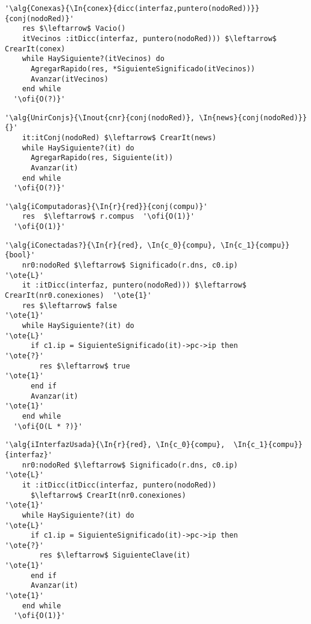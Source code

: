 \begin{lstlisting}[mathescape]
  '\alg{Conexas}{\In{conex}{dicc(interfaz,puntero(nodoRed))}}{conj(nodoRed)}'
    res $\leftarrow$ Vacio()
    itVecinos :itDicc(interfaz, puntero(nodoRed))) $\leftarrow$ CrearIt(conex)
    while HaySiguiente?(itVecinos) do                                                    
      AgregarRapido(res, *SiguienteSignificado(itVecinos))
      Avanzar(itVecinos)
    end while
  '\ofi{O(?)}'
\end{lstlisting}


\begin{lstlisting}[mathescape]
  '\alg{UnirConjs}{\Inout{cnr}{conj(nodoRed)}, \In{news}{conj(nodoRed)}}{}'
    it:itConj(nodoRed) $\leftarrow$ CrearIt(news)
    while HaySiguiente?(it) do                                                     
      AgregarRapido(res, Siguiente(it))
      Avanzar(it)
    end while
  '\ofi{O(?)}'
\end{lstlisting}


\begin{lstlisting}[mathescape]
  '\alg{iComputadoras}{\In{r}{red}}{conj(compu)}'
    res  $\leftarrow$ r.compus  '\ofi{O(1)}'
  '\ofi{O(1)}'
\end{lstlisting}

\begin{lstlisting}[mathescape]
  '\alg{iConectadas?}{\In{r}{red}, \In{c_0}{compu}, \In{c_1}{compu}}{bool}'
    nr0:nodoRed $\leftarrow$ Significado(r.dns, c0.ip)                   '\ote{L}' 
    it :itDicc(interfaz, puntero(nodoRed))) $\leftarrow$ CrearIt(nr0.conexiones)  '\ote{1}' 
    res $\leftarrow$ false                                                         '\ote{1}'
    while HaySiguiente?(it) do                                                     '\ote{L}'
      if c1.ip = SiguienteSignificado(it)->pc->ip then                              '\ote{?}'
        res $\leftarrow$ true                                                      '\ote{1}'
      end if
      Avanzar(it)                                                                  '\ote{1}'
    end while
  '\ofi{O(L * ?)}'
\end{lstlisting}

\begin{lstlisting}[mathescape]
  '\alg{iInterfazUsada}{\In{r}{red}, \In{c_0}{compu},  \In{c_1}{compu}}{interfaz}'
    nr0:nodoRed $\leftarrow$ Significado(r.dns, c0.ip)                   '\ote{L}' 
    it :itDicc(itDicc(interfaz, puntero(nodoRed)) 
      $\leftarrow$ CrearIt(nr0.conexiones)                                        '\ote{1}' 
    while HaySiguiente?(it) do                                                     '\ote{L}'
      if c1.ip = SiguienteSignificado(it)->pc->ip then                             '\ote{?}'
        res $\leftarrow$ SiguienteClave(it)                                        '\ote{1}'
      end if
      Avanzar(it)                                                                  '\ote{1}'
    end while
  '\ofi{O(1)}'
\end{lstlisting}


